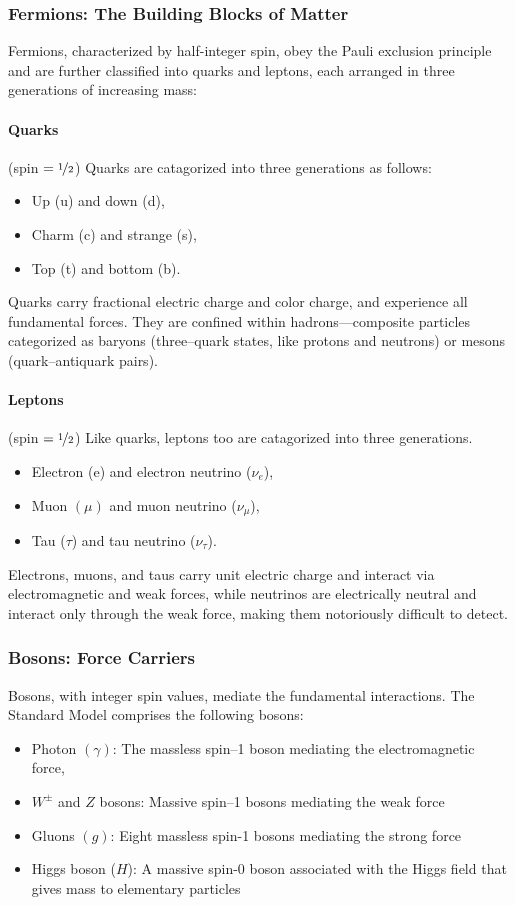 \subsubsection{Fermions: The Building Blocks of Matter}
Fermions, characterized by half-integer spin, obey the Pauli exclusion principle and are further classified into quarks and leptons, each arranged in three generations of increasing mass:
\paragraph{Quarks} (spin $ = \nicefrac{1}{2}$)
Quarks are catagorized into three generations as follows:
\begin{itemize}
    \item Up (u) and down (d),
    \item Charm (c) and strange (s),
    \item Top (t) and bottom (b).
\end{itemize}

Quarks carry fractional electric charge and color charge, and experience all fundamental forces.
%
They are confined within hadrons---composite particles categorized as baryons (three--quark states, like protons and neutrons) or mesons (quark--antiquark pairs).

\paragraph{Leptons} (spin $ = \nicefrac{1}{2}$)
Like quarks, leptons too are catagorized into three generations.
\begin{itemize}
    \item Electron (e) and electron neutrino ($\nu_e$),
    \item Muon $(\mu)$ and muon neutrino ($\nu_\mu$),
    \item Tau ($\tau$) and tau neutrino ($\nu_\tau$).
\end{itemize}

Electrons, muons, and taus carry unit electric charge and interact via electromagnetic and weak forces, while neutrinos are electrically neutral and interact only through the weak force, making them notoriously difficult to detect.

\subsubsection{Bosons: Force Carriers}
Bosons, with integer spin values, mediate the fundamental interactions. The Standard Model comprises the following bosons:
\begin{itemize}
    \item Photon $(\gamma)$: The massless spin--1 boson mediating the electromagnetic force,
    \item $W^\pm$ and $Z$ bosons: Massive spin--1 bosons mediating the weak force
    \item Gluons $(g)$: Eight massless spin-1 bosons mediating the strong force
    \item Higgs boson ($H$): A massive spin-0 boson associated with the Higgs field that gives mass to elementary particles
\end{itemize}

